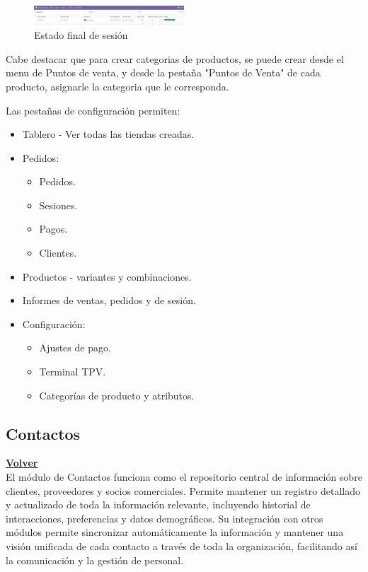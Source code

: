 \documentclass[a4paper,12pt]{article}
\begin{document}
\begin{figure}[h!]
    \centering
    \includegraphics[width=0.5\textwidth]{pr2odoo61-estadoFinalSesion.png}
    \caption{Estado final de sesión}
\end{figure}
\FloatBarrier

Cabe destacar que para crear categorias de productos, se puede crear desde el menu de Puntos de venta, y desde la pestaña "Puntos de Venta" de cada producto, asignarle la categoria que le corresponda.

Las pestañas de configuración permiten:
\begin{itemize}
    \item Tablero - Ver todas las tiendas creadas.
    \item Pedidos:
    \begin{itemize}
        \item  Pedidos.
        \item  Sesiones.
        \item  Pagos.
        \item  Clientes.
    \end{itemize}
    \item Productos - variantes y combinaciones.
    \item Informes de ventas, pedidos y de sesión.
    \item Configuración:
    \begin{itemize}
        \item  Ajustes de pago.
        \item  Terminal TPV.
        \item  Categorías de producto y atributos.
    \end{itemize}
\end{itemize}


\subsection{Contactos}
\hyperlink{anchor-indice}{\textbf{Volver}}\\

El módulo de Contactos funciona como el repositorio central de información sobre clientes, proveedores y socios comerciales. Permite mantener un registro detallado y actualizado de toda la información relevante, incluyendo historial de interacciones, preferencias y datos demográficos.
Su integración con otros módulos permite sincronizar automáticamente la información y mantener una visión unificada de cada contacto a través de toda la organización, facilitando así la comunicación y la gestión de personal.
\end{document}
